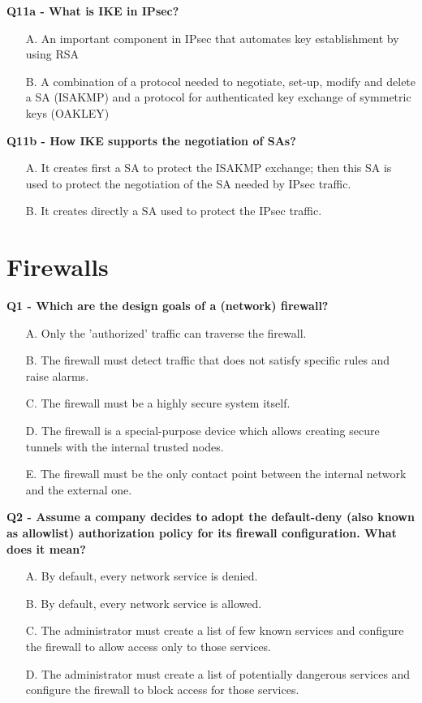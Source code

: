 \textbf{Q11a - What is IKE in IPsec?}
\begin{itemize}
    \item[A.] An important component in IPsec that automates key establishment by using RSA
    \item[B.] A combination of a protocol needed to negotiate, set-up, modify and delete a SA (ISAKMP) and a protocol for authenticated key exchange of symmetric keys (OAKLEY)
\end{itemize}
\textbf{Q11b - How IKE supports the negotiation of SAs?}
\begin{itemize}
    \item[A.] It creates first a SA to protect the ISAKMP exchange; then this SA is used to protect the negotiation of the SA needed by IPsec traffic.
    \item[B.] It creates directly a SA used to protect the IPsec traffic.
\end{itemize}

\section*{Firewalls}

\textbf{Q1 - Which are the design goals of a (network) firewall?}
\begin{itemize}
    \item[A.] Only the 'authorized' traffic can traverse the firewall.
    \item[B.] The firewall must detect traffic that does not satisfy specific rules and raise alarms.
    \item[C.] The firewall must be a highly secure system itself.
    \item[D.] The firewall is a special-purpose device which allows creating secure tunnels with the internal trusted nodes.
    \item[E.] The firewall must be the only contact point between the internal network and the external one.
\end{itemize}

\textbf{Q2 - Assume a company decides to adopt the default-deny (also known as allowlist) authorization policy for its firewall configuration. What does it mean?}
\begin{itemize}
    \item[A.] By default, every network service is denied.
    \item[B.] By default, every network service is allowed.
    \item[C.] The administrator must create a list of few known services and configure the firewall to allow access only to those services.
    \item[D.] The administrator must create a list of potentially dangerous services and configure the firewall to block access for those services.
\end{itemize}

